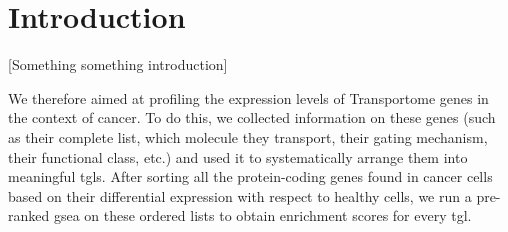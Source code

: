 \section{Introduction}

[Something something introduction]

We therefore aimed at profiling the expression levels of Transportome genes in the context of cancer. To do this, we collected information on these genes (such as their complete list, which molecule they transport, their gating mechanism, their functional class, etc.) and used it to systematically arrange them into meaningful \glspl{tgl}. After sorting all the protein-coding genes found in cancer cells based on their differential expression with respect to healthy cells, we run a pre-ranked \gls{gsea} on these ordered lists to obtain enrichment scores for every \gls{tgl}.